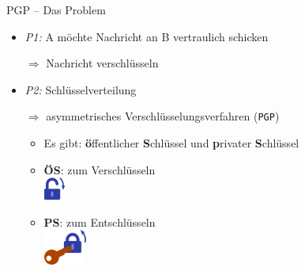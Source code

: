 \documentclass{beamer}
\begin{document}

\begin{frame}{PGP – Das Problem}
  
  \begin{itemize}
   \item \textit{P1:} A möchte Nachricht an B vertraulich schicken\\
   \item[$\Rightarrow$] Nachricht verschlüsseln

   \pause

   \vspace*{.5\baselineskip}

   \item\textit{P2:} Schlüsselverteilung\\
   \item[$\Rightarrow$] asymmetrisches Verschlüsselungsverfahren (\texttt{PGP})
   \begin{itemize}
    \item Es gibt: \textbf{ö}ffentlicher \textbf{S}chlüssel und \textbf{p}rivater \textbf{S}chlüssel
   
    \pause

    \vspace*{.5\baselineskip}

    \item \textbf{ÖS}: zum Verschlüsseln\\
    {\vspace*{4mm}\hspace{12mm}\includegraphics[width=7mm]{img-src/padlock-lock}}
   
   
    \item \textbf{PS}: zum Entschlüsseln\\
    {\vspace*{4mm}\hspace{5mm}\includegraphics[width=14mm]{img-src/padlock-unlock-with-key}}

   \end{itemize}
  \end{itemize}


\end{frame}
\end{document}
